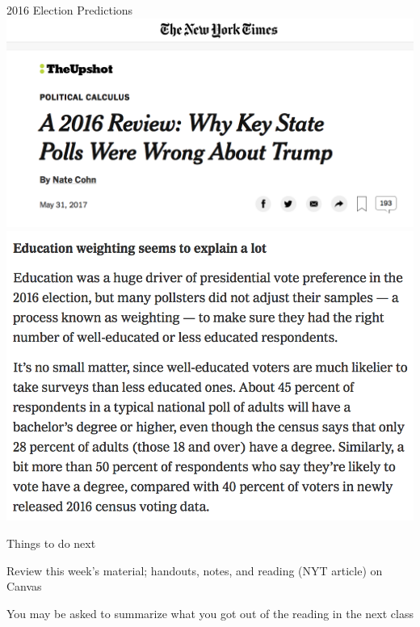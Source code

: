 \documentclass{./../div_teaching_slides}
\begin{document}
\begin{frame}{2016 Election Predictions}
\centering
 \includegraphics[scale=0.14]{nyt2.png} \\
\includegraphics[scale=0.19]{nyt.png} \\
\end{frame}


\begin{frame}{Things to do next}
\begin{witemize}
\item Review this week's material; handouts, notes, and reading (NYT article) on Canvas
\item You may be asked to summarize what you got out of the reading in the next class
\end{witemize}
\end{frame}
\end{document}

